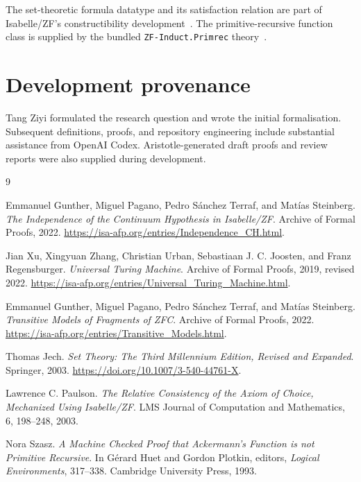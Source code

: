 \documentclass[11pt,a4paper]{article}
\begin{document}
The set-theoretic formula datatype and its satisfaction relation are part
of Isabelle/ZF's constructibility development~\cite{paulson-zf}. The
primitive-recursive function class is supplied by the bundled
\texttt{ZF-Induct.Primrec} theory~\cite{szasz}.



\clearpage
\section*{Development provenance}
Tang Ziyi formulated the research question and wrote the initial
formalisation. Subsequent definitions, proofs, and repository engineering
include substantial assistance from OpenAI Codex. Aristotle-generated
draft proofs and review reports were also supplied during development.

\begin{thebibliography}{9}

Emmanuel Gunther, Miguel Pagano, Pedro S\'anchez Terraf, and Mat\'ias Steinberg.
\emph{The Independence of the Continuum Hypothesis in Isabelle/ZF}.
Archive of Formal Proofs, 2022.
\url{https://isa-afp.org/entries/Independence_CH.html}.

Jian Xu, Xingyuan Zhang, Christian Urban, Sebastiaan J. C. Joosten, and
Franz Regensburger.
\emph{Universal Turing Machine}.
Archive of Formal Proofs, 2019, revised 2022.
\url{https://isa-afp.org/entries/Universal_Turing_Machine.html}.

Emmanuel Gunther, Miguel Pagano, Pedro S\'anchez Terraf, and Mat\'ias Steinberg.
\emph{Transitive Models of Fragments of ZFC}.
Archive of Formal Proofs, 2022.
\url{https://isa-afp.org/entries/Transitive_Models.html}.

Thomas Jech.
\emph{Set Theory: The Third Millennium Edition, Revised and Expanded}.
Springer, 2003.
\url{https://doi.org/10.1007/3-540-44761-X}.

Lawrence C. Paulson.
\emph{The Relative Consistency of the Axiom of Choice, Mechanized Using
Isabelle/ZF}.
LMS Journal of Computation and Mathematics, 6, 198--248, 2003.

Nora Szasz.
\emph{A Machine Checked Proof that Ackermann's Function is not Primitive
Recursive}.
In G\'erard Huet and Gordon Plotkin, editors, \emph{Logical Environments},
317--338. Cambridge University Press, 1993.

\end{thebibliography}
\end{document}
